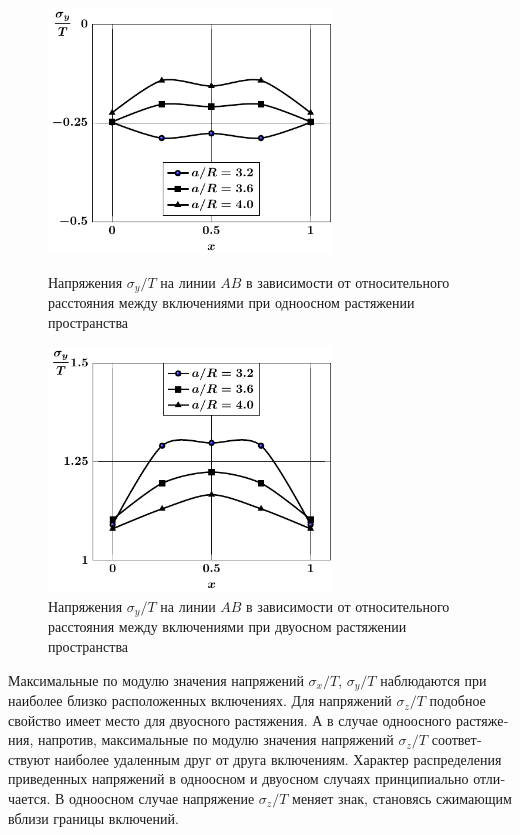 \begin{russian}
\begin{figure}[h!]
\centering\footnotesize
\parbox[b]{7.5cm}{\centering\includegraphics[width=7.5cm]{inc5-a-d95-g25-t1-ab-sig_y.pdf}
\caption{Напряжения $\sigma_y/T$ на линии  $AB$ в зависимости от относительного расстояния между включениями при одноосном растяжении пространства
\label{f:8:56}}}\hfil\hfil
\parbox[b]{7.5cm}{\centering\includegraphics[width=7.5cm]{inc5-a-d95-g25-t2-ab-sig_y.pdf}
\caption{Напряжения $\sigma_y/T$ на линии  $AB$ в зависимости от относительного расстояния между включениями при двуосном растяжении пространства
\label{f:8:57}}}
\end{figure}

Максимальные по модулю значения напряжений $\sigma_x/T$, $\sigma_y/T$ наблюдаются при наиболее близко расположенных включениях. Для напряжений $\sigma_z/T$ подобное свойство имеет место для двуосного растяжения. А в случае одноосного растяжения, напротив, максимальные по модулю значения напряжений $\sigma_z/T$ соответствуют наиболее удаленным друг от друга включениям. Характер распределения приведенных напряжений в одноосном и двуосном случаях принципиально отличается. В одноосном случае напряжение $\sigma_z/T$ меняет знак, становясь сжимающим вблизи границы включений.


\end{russian}
